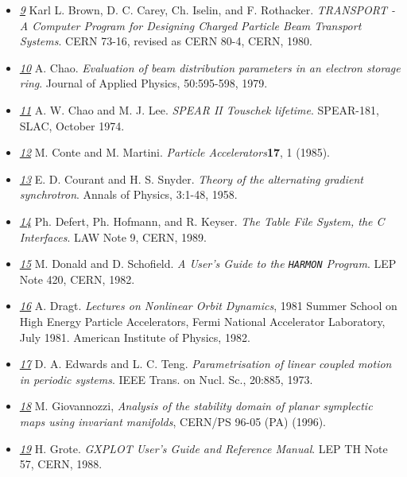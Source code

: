 \begin{itemize}
	\item \href{transport}{\textit{9}} Karl L. Brown, D. C. Carey, Ch. Iselin, and F. Rothacker. \textit{TRANSPORT - A Computer Program for Designing Charged   Particle Beam Transport Systems}. CERN 73-16, revised as CERN 80-4, CERN, 1980. 


	\item \href{chao}{\textit{10}} A. Chao. \textit{Evaluation of beam distribution parameters in an electron   storage ring}. Journal of Applied Physics, 50:595-598, 1979. 


	\item \href{chao1}{\textit{11}} A. W. Chao and M. J. Lee. \textit{SPEAR II Touschek lifetime}. SPEAR-181, SLAC, October 1974. 


	\item \href{conte}{\textit{12}} M. Conte and M. Martini. \textit{Particle Accelerators}\textbf{17}, 1 (1985). 


	\item \href{courant}{\textit{13}} E. D. Courant and H. S. Snyder. \textit{Theory of the alternating gradient synchrotron}. Annals of Physics, 3:1-48, 1958. 


	\item \href{tfs}{\textit{14}} Ph. Defert, Ph. Hofmann, and R. Keyser. \textit{The Table File System, the C Interfaces}. LAW Note 9, CERN, 1989. 


	\item \href{donald}{\textit{15}} M. Donald and D. Schofield. \textit{A User's Guide to the \texttt{HARMON} Program}. LEP Note 420, CERN, 1982. 


	\item \href{dragt}{\textit{16}} A. Dragt. \textit{Lectures on Nonlinear Orbit Dynamics}, 1981 Summer School on High   Energy Particle Accelerators, Fermi National Accelerator Laboratory, July   1981. American Institute of Physics, 1982. 


	\item \href{edwards}{\textit{17}} D. A. Edwards and L. C. Teng. \textit{Parametrisation of linear coupled motion in periodic systems}. IEEE Trans. on Nucl. Sc., 20:885, 1973. 


	\item \href{giovanozzi}{\textit{18}} M. Giovannozzi, \textit{Analysis of the stability domain of planar symplectic maps using invariant manifolds}, CERN/PS 96-05 (PA) (1996). 


	\item \href{gxplot}{\textit{19}} H. Grote. \textit{GXPLOT User's Guide and Reference Manual}. LEP TH Note 57, CERN, 1988. 



\end{itemize}
